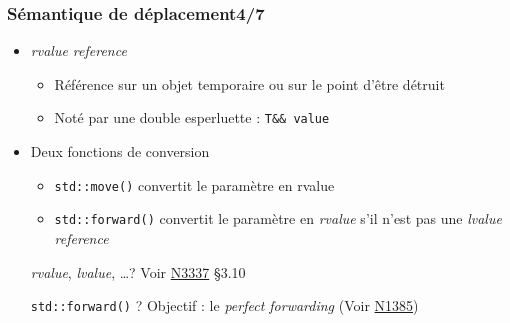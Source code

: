 \documentclass[C++.tex]{subfiles}
\begin{document}
\begin{frame}[fragile]
	\frametitle{Sémantique de déplacement\titlehfill{}4/7}
	\begin{itemize}
		\item \textit{rvalue reference}
		\begin{itemize}
			\item Référence sur un objet temporaire ou sur le point d'être détruit
			\item Noté par une double esperluette : \lstinline|T&& value|
		\end{itemize}
		\item Deux fonctions \og de conversion\fg{}
		\begin{itemize}
			\item \lstinline|std::move()| convertit le paramètre en rvalue


			\item \lstinline|std::forward()| convertit le paramètre en \textit{rvalue} s'il n'est pas une \textit{lvalue reference}
		\end{itemize}

		\begin{block}{\textit{rvalue}, \textit{lvalue}, \ldots ?}
			Voir \href{http://www.open-std.org/jtc1/sc22/wg21/docs/papers/2012/n3337.pdf}{N3337} §3.10
		\end{block}

		\begin{block}{\lstinline|std::forward()| ?}
			Objectif : le \textit{perfect forwarding} (Voir \href{http://www.open-std.org/jtc1/sc22/wg21/docs/papers/2002/n1385.htm}{N1385})
		\end{block}
	\end{itemize}
\end{frame}
\end{document}
